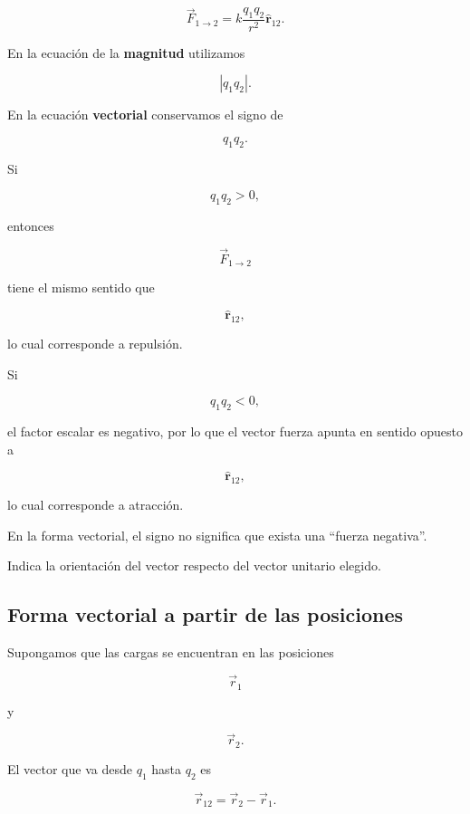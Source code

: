\[
\vec{F}_{1\to2}
=
k\frac{q_1q_2}{r^2}
\hat{\mathbf{r}}_{12}.
\]

En la ecuación de la \textbf{magnitud} utilizamos

\[
|q_1q_2|.
\]

En la ecuación \textbf{vectorial} conservamos el signo de

\[
q_1q_2.
\]

Si

\[
q_1q_2>0,
\]

entonces

\[
\vec{F}_{1\to2}
\]

tiene el mismo sentido que

\[
\hat{\mathbf{r}}_{12},
\]

lo cual corresponde a repulsión.

Si

\[
q_1q_2<0,
\]

el factor escalar es negativo, por lo que el vector fuerza apunta en sentido
opuesto a

\[
\hat{\mathbf{r}}_{12},
\]

lo cual corresponde a atracción.

\begin{idea}

En la forma vectorial, el signo no significa que exista una ``fuerza
negativa''.

Indica la orientación del vector respecto del vector unitario elegido.

\end{idea}



\subsection{Forma vectorial a partir de las posiciones}

Supongamos que las cargas se encuentran en las posiciones

\[
\vec{r}_1
\]

y

\[
\vec{r}_2.
\]

El vector que va desde \(q_1\) hasta \(q_2\) es

\begin{equation}
    \boxed{
    \vec{r}_{12}
    =
    \vec{r}_2-\vec{r}_1
    }.
    \label{eq:vector_posicion_12}
\end{equation}

